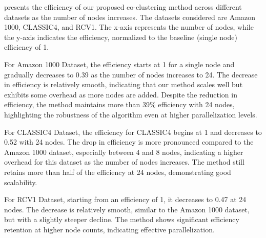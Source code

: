 \documentclass[journal]{IEEEtran}
\theoremstyle{definition}
\theoremstyle{remark} %
\begin{document}
 presents the efficiency of our proposed co-clustering method across different datasets as the number of nodes increases. The datasets considered are Amazon 1000, CLASSIC4, and RCV1. The x-axis represents the number of nodes, while the y-axis indicates the efficiency, normalized to the baseline (single node) efficiency of 1.

For Amazon 1000 Dataset, the efficiency starts at 1 for a single node and gradually decreases to 0.39 as the number of nodes increases to 24. The decrease in efficiency is relatively smooth, indicating that our method scales well but exhibits some overhead as more nodes are added. Despite the reduction in efficiency, the method maintains more than 39\% efficiency with 24 nodes, highlighting the robustness of the algorithm even at higher parallelization levels.

For CLASSIC4 Dataset, the efficiency for CLASSIC4 begins at 1 and decreases to 0.52 with 24 nodes. The drop in efficiency is more pronounced compared to the Amazon 1000 dataset, especially between 4 and 8 nodes, indicating a higher overhead for this dataset as the number of nodes increases. The method still retains more than half of the efficiency at 24 nodes, demonstrating good scalability.

For RCV1 Dataset, starting from an efficiency of 1, it decreases to 0.47 at 24 nodes. The decrease is relatively smooth, similar to the Amazon 1000 dataset, but with a slightly steeper decline. The method shows significant efficiency retention at higher node counts, indicating effective parallelization.
\end{document}
